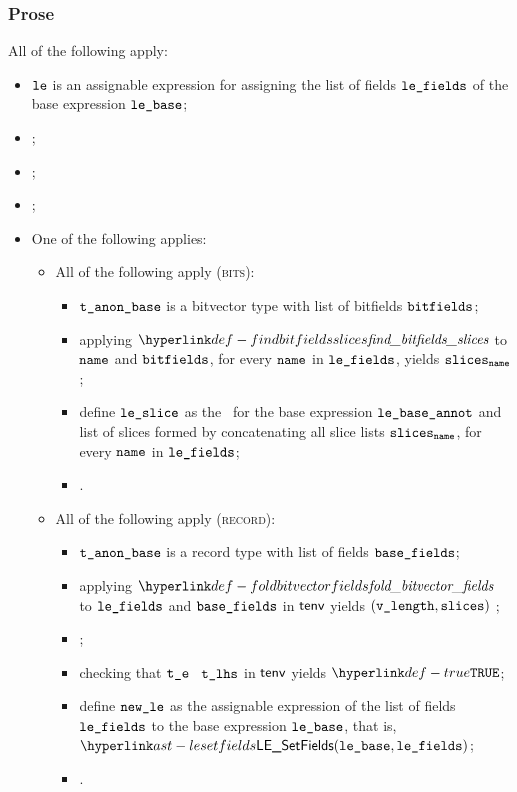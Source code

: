 \subsubsection{Prose}
All of the following apply:
\begin{itemize}
  \item $\texttt{le}$ is an assignable expression for assigning the list of fields $\texttt{le\_fields}$ of the base
        expression $\lebase$;
  \item {}\ProseOrTypeError;
  \item \Proseannotatelexpr{$\tenv$}{$\lebase$}{$\tbase$}{$(\lebaseannot, \vsesbase)$}\ProseOrTypeError;
  \item \Prosemakeanonymous{$\tenv$}{$\tbase$}{\\ $\tbaseanon$}\ProseOrTypeError;
  \item One of the following applies:
  \begin{itemize}
    \item All of the following apply (\textsc{bits}):
    \begin{itemize}
      \item $\texttt{t\_anon\_base}$ is a bitvector type with list of bitfields $\texttt{bitfields}$;
      \item applying $\findbitfieldsslices$ to $\texttt{name}$ and $\texttt{bitfields}$, for every $\texttt{name}$ in $\texttt{le\_fields}$, yields $\texttt{slices}_{\texttt{name}}$\ProseOrTypeError;
      \item define $\vleslice$ as the \ProseLESlice\ for the base expression $\texttt{le\_base\_annot}$ and list of slices formed by concatenating all
            slice lists $\texttt{slices}_{\texttt{name}}$, for every $\texttt{name}$ in $\texttt{le\_fields}$;
      \item \Proseannotatelexpr{$\tenv$}{$\vleslice$}{$\vte$}{$(\newle, \vses)$}\ProseOrTypeError.
    \end{itemize}

    \item All of the following apply (\textsc{record}):
    \begin{itemize}
      \item $\texttt{t\_anon\_base}$ is a record type with list of fields $\texttt{base\_fields}$;
      \item applying $\foldbitvectorfields$ to $\texttt{le\_fields}$ and $\texttt{base\_fields}$ in $\tenv$ yields $(\texttt{v\_length}, \texttt{slices})$ \ProseOrTypeError;
      \item {};
      \item checking that $\vte$ \typesatisfies\ $\texttt{t\_lhs}$ in $\tenv$ yields $\True$\ProseOrTypeError;
      \item define $\texttt{new\_le}$ as the assignable expression of the list of fields $\texttt{le\_fields}$ to the base expression $\lebase$, that is,
            $\LESetFields(\lebase, \vlefields)$;
      \item \Proseeqdef{$\vses$}{$\vsesbase$}.
    \end{itemize}


\end{itemize}
\end{itemize}
